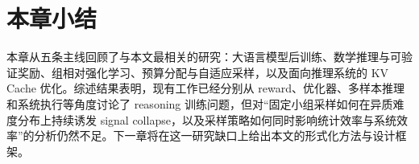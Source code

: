\section{本章小结}

本章从五条主线回顾了与本文最相关的研究：大语言模型后训练、数学推理与可验证奖励、组相对强化学习、预算分配与自适应采样，以及面向推理系统的 KV Cache 优化。综述结果表明，现有工作已经分别从 reward、优化器、多样本推理和系统执行等角度讨论了 reasoning 训练问题，但对“固定小组采样如何在异质难度分布上持续诱发 signal collapse，以及采样策略如何同时影响统计效率与系统效率”的分析仍然不足。下一章将在这一研究缺口上给出本文的形式化方法与设计框架。
